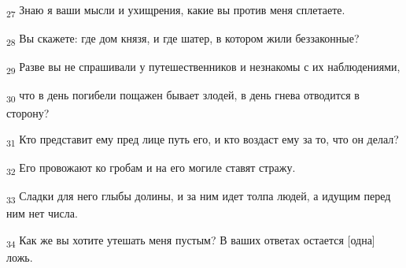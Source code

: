 \begin{tcolorbox}
\textsubscript{27} Знаю я ваши мысли и ухищрения, какие вы против меня сплетаете.
\end{tcolorbox}
\begin{tcolorbox}
\textsubscript{28} Вы скажете: где дом князя, и где шатер, в котором жили беззаконные?
\end{tcolorbox}
\begin{tcolorbox}
\textsubscript{29} Разве вы не спрашивали у путешественников и незнакомы с их наблюдениями,
\end{tcolorbox}
\begin{tcolorbox}
\textsubscript{30} что в день погибели пощажен бывает злодей, в день гнева отводится в сторону?
\end{tcolorbox}
\begin{tcolorbox}
\textsubscript{31} Кто представит ему пред лице путь его, и кто воздаст ему за то, что он делал?
\end{tcolorbox}
\begin{tcolorbox}
\textsubscript{32} Его провожают ко гробам и на его могиле ставят стражу.
\end{tcolorbox}
\begin{tcolorbox}
\textsubscript{33} Сладки для него глыбы долины, и за ним идет толпа людей, а идущим перед ним нет числа.
\end{tcolorbox}
\begin{tcolorbox}
\textsubscript{34} Как же вы хотите утешать меня пустым? В ваших ответах остается [одна] ложь.
\end{tcolorbox}
